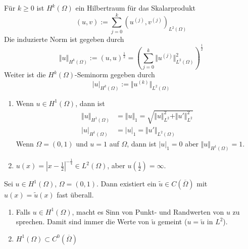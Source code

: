 \begin{satz}
    Für $k \geq 0$ ist $H^k(\Omega)$ ein Hilbertraum für das Skalarprodukt
    \[
        (u, v) := \sum_{j=0}^k ( u^{(j)}, v^{(j)} )_{L^2(\Omega)}
    \]
    Die induzierte Norm ist gegeben durch
    \[
        \Vert u \Vert_{H^k(\Omega)} := (u, u)^{\frac 1 2} = \left( \sum_{j=0}^k \Vert u^{(j)} \Vert_{L^2(\Omega)}^2 \right)^{\frac 1 2}
    \]
    Weiter ist die $H^k(\Omega)$-Seminorm gegeben durch
    \[
        \vert u \vert_{H^k(\Omega)} := \Vert u^{(k)} \Vert_{L^2(\Omega)}
    \]
\end{satz}

\begin{bspe}
    \begin{enumerate}
        \item Wenn $u \in H^1(\Omega)$, dann ist
            \begin{align*}
                \Vert u \Vert_{H^1(\Omega)} &= \Vert u \Vert_1 = \sqrt{ \Vert u \Vert_{L^2}^2 + \Vert u' \Vert_{L^2}^2 } \\
                \vert u \vert_{H^1(\Omega)} &= \vert u \vert_1 = \Vert u' \Vert_{L^2(\Omega)}
            \end{align*}
            Wenn $\Omega = (0,1)$ und $u = 1$ auf $\Omega$, dann ist $|u|_1 = 0$ aber $\Vert u \Vert_{H^1(\Omega)} = 1$.
        \item $u(x) = |x - \frac 1 2 |^{- \frac 1 4} \in L^2(\Omega)$, aber $u(\frac 1 2) = \infty$.
    \end{enumerate}
\end{bspe}

\begin{satz}
    Sei $u \in H^1(\Omega)$, $\Omega = (0,1)$. Dann existiert ein $\tilde u \in C(\overline \Omega)$ mit $u(x) = \tilde u(x)$
    fast überall.
\end{satz}

\begin{bem}
    \begin{enumerate}
        \item Falls $u \in H^1(\Omega)$, macht es Sinn von Punkt- und Randwerten von $u$ zu sprechen. Damit sind immer die 
            Werte von $\tilde u$ gemeint ($u = \tilde u$ in $L^2$).
        \item $H^1(\Omega) \subset C^0(\overline \Omega)$
    \end{enumerate}
\end{bem}

